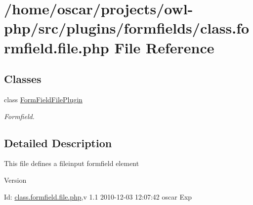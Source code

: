 \section{/home/oscar/projects/owl-\/php/src/plugins/formfields/class.formfield.file.php File Reference}
\label{class_8formfield_8file_8php}
\subsection*{Classes}
\begin{DoxyCompactItemize}
\item 
class \hyperlink{classFormFieldFilePlugin}{FormFieldFilePlugin}
\begin{DoxyCompactList}\small\item\em Formfield. \item\end{DoxyCompactList}\end{DoxyCompactItemize}


\subsection{Detailed Description}
This file defines a fileinput formfield element \begin{DoxyVersion}{Version}

\end{DoxyVersion}
\begin{DoxyParagraph}{Id:}
\hyperlink{class_8formfield_8file_8php}{class.formfield.file.php},v 1.1 2010-\/12-\/03 12:07:42 oscar Exp 
\end{DoxyParagraph}
